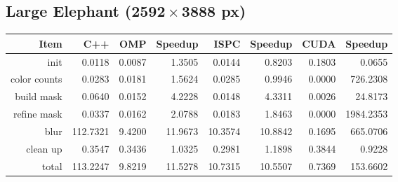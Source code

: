 \documentclass[12pt]{article}
\begin{document}
\subsection{Large Elephant ($\mathbf{2592 \times 3888}$ px)}

\begin{tabular}{r|r|r|r|r|r|r|r}
    Item & C++ & OMP & Speedup & ISPC & Speedup & CUDA & Speedup
\\  \hline
    init & 0.0118 & 0.0087 & 1.3505 & 0.0144 & 0.8203 & 0.1803 & 0.0655
\\  color counts & 0.0283 & 0.0181 & 1.5624 & 0.0285 & 0.9946 & 0.0000 & 726.2308
\\  build mask & 0.0640 & 0.0152 & 4.2228 & 0.0148 & 4.3311 & 0.0026 & 24.8173
\\  refine mask & 0.0337 & 0.0162 & 2.0788 & 0.0183 & 1.8463 & 0.0000 & 1984.2353
\\  blur & 112.7321 & 9.4200 & 11.9673 & 10.3574 & 10.8842 & 0.1695 & 665.0706
\\  clean up & 0.3547 & 0.3436 & 1.0325 & 0.2981 & 1.1898 & 0.3844 & 0.9228
\\  \hline
    total & 113.2247 & 9.8219 & 11.5278 & 10.7315 & 10.5507 & 0.7369 & 153.6602
\end{tabular}
\end{document}
